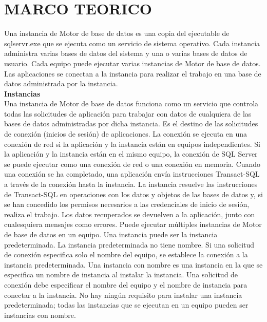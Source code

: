 \section{MARCO TEORICO} 

Una instancia de Motor de base de datos es una copia del ejecutable de sqlservr.exe que se ejecuta como un servicio de sistema operativo. Cada instancia administra varias bases de datos del sistema y una o varias bases de datos de usuario. Cada equipo puede ejecutar varias instancias de Motor de base de datos. Las aplicaciones se conectan a la instancia para realizar el trabajo en una base de datos administrada por la instancia.\\

\textbf{Instancias}\\

Una instancia de Motor de base de datos funciona como un servicio que controla todas las solicitudes de aplicación para trabajar con datos de cualquiera de las bases de datos administradas por dicha instancia. Es el destino de las solicitudes de conexión (inicios de sesión) de aplicaciones. La conexión se ejecuta en una conexión de red si la aplicación y la instancia están en equipos independientes. Si la aplicación y la instancia están en el mismo equipo, la conexión de SQL Server se puede ejecutar como una conexión de red o una conexión en memoria. Cuando una conexión se ha completado, una aplicación envía instrucciones Transact-SQL a través de la conexión hasta la instancia. La instancia resuelve las instrucciones de Transact-SQL en operaciones con los datos y objetos de las bases de datos y, si se han concedido los permisos necesarios a las credenciales de inicio de sesión, realiza el trabajo. Los datos recuperados se devuelven a la aplicación, junto con cualesquiera mensajes como errores.
Puede ejecutar múltiples instancias de Motor de base de datos en un equipo. Una instancia puede ser la instancia predeterminada. La instancia predeterminada no tiene nombre. Si una solicitud de conexión especifica solo el nombre del equipo, se establece la conexión a la instancia predeterminada. Una instancia con nombre es una instancia en la que se especifica un nombre de instancia al instalar la instancia. Una solicitud de conexión debe especificar el nombre del equipo y el nombre de instancia para conectar a la instancia. No hay ningún requisito para instalar una instancia predeterminada; todas las instancias que se ejecutan en un equipo pueden ser instancias con nombre.

